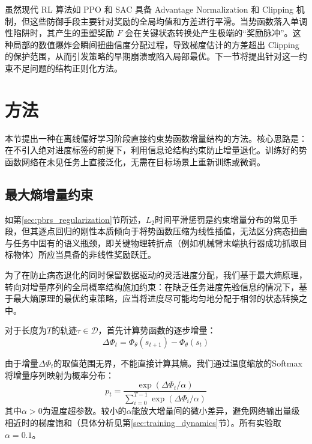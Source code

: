 虽然现代 RL 算法如 PPO \cite{schulman2017} 和 SAC \cite{haarnoja2018} 具备 Advantage Normalization 和 Clipping 机制，但这些防御手段主要针对奖励的全局均值和方差进行平滑。当势函数落入单调性陷阱时，其产生的重塑奖励 $F$ 会在关键状态转换处产生极端的“奖励脉冲”。这种局部的数值爆炸会瞬间扭曲信度分配过程，导致梯度估计的方差超出 Clipping 的保护范围，从而引发策略的早期崩溃或陷入局部最优。下一节将提出针对这一约束不足问题的结构正则化方法。

\section{方法}

本节提出一种在离线偏好学习阶段直接约束势函数增量结构的方法。核心思路是：在不引入绝对进度标签的前提下，利用信息论结构约束防止增量退化。训练好的势函数网络在未见任务上直接泛化，无需在目标场景上重新训练或微调。

\subsection{最大熵增量约束}

如第\ref{sec:pbrs_regularization}节所述，$L_2$时间平滑惩罚是约束增量分布的常见手段，但其逐点回归的刚性本质倾向于将势函数压缩为线性插值，无法区分病态扭曲与任务中固有的语义瓶颈，即关键物理转折点（例如机械臂末端执行器成功抓取目标物体）所应当具备的非线性奖励跃迁。

为了在防止病态退化的同时保留数据驱动的灵活进度分配，我们基于最大熵原理\cite{shannon1948,jaynes1957}，转向对增量序列的全局概率结构施加约束：在缺乏任务进度先验信息的情况下，基于最大熵原理的最优约束策略，应当将进度尽可能均匀地分配于相邻的状态转换之中。

对于长度为$T$的轨迹$\tau \in \mathcal{D}$，首先计算势函数的逐步增量：
\begin{equation}
\label{eq:delta_phi}
    \Delta\Phi_t = \Phi_\theta(s_{t+1}) - \Phi_\theta(s_t)
\end{equation}

由于增量$\Delta\Phi_t$的取值范围无界，不能直接计算其熵。我们通过温度缩放的Softmax将增量序列映射为概率分布：
\begin{equation}
\label{eq:softmax}
    p_t = \frac{\exp(\Delta\Phi_t / \alpha)}{\sum_{i=0}^{T-1} \exp(\Delta\Phi_i / \alpha)}
\end{equation}
其中$\alpha > 0$为温度超参数。较小的$\alpha$能放大增量间的微小差异，避免网络输出量级相近时的梯度饱和（具体分析见第\ref{sec:training_dynamics}节）。所有实验取$\alpha = 0.1$。

